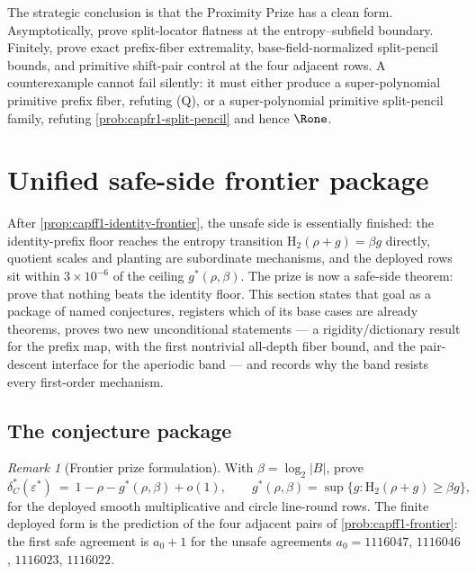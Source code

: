 \documentclass[11pt]{article}
\theoremstyle{definition}
\theoremstyle{remark}
\newtheorem{remark}[remark]{Remark}
\newcommand{\F}{\mathbb{F}}
\newcommand{\B}{B}
\newcommand{\RS}{\mathrm{RS}}
\newcommand{\Hb}{\mathrm{H}_2}
\begin{document}
The strategic conclusion is that the Proximity Prize has a clean form.  Asymptotically, prove split-locator flatness at the entropy--subfield boundary.  Finitely, prove exact prefix-fiber extremality, base-field-normalized split-pencil bounds, and primitive shift-pair control at the four adjacent rows.  A counterexample cannot fail silently: it must either produce a super-polynomial primitive prefix fiber, refuting \textup{(Q)}, or a super-polynomial primitive split-pencil family, refuting \cref{prob:capfr1-split-pencil} and hence \(\Rone\).

\providecommand{\F}{\mathbb F}
\providecommand{\RS}{\mathrm{RS}}
\providecommand{\ceil}[1]{\left\lceil #1\right\rceil}
\providecommand{\floor}[1]{\left\lfloor #1\right\rfloor}

\section{Unified safe-side frontier package}\label{sec:capfp-prize}

After \cref{prop:capff1-identity-frontier}, the unsafe side is essentially finished: the identity-prefix floor reaches the entropy transition $\Hb(\rho+g)=\beta g$ directly, quotient scales and planting are subordinate mechanisms, and the deployed rows sit within $3\times10^{-6}$ of the ceiling $g^*(\rho,\beta)$.  The prize is now a safe-side theorem: prove that nothing beats the identity floor.  This section states that goal as a package of named conjectures, registers which of its base cases are already theorems, proves two new unconditional statements --- a rigidity/dictionary result for the prefix map, with the first nontrivial all-depth fiber bound, and the pair-descent interface for the aperiodic band --- and records why the band resists every first-order mechanism.

\subsection{The conjecture package}

\begin{remark}[Frontier prize formulation]\label{prob:capfp-F}
With $\beta=\log_2|\B|$, prove
\[
        \delta^*_C(\varepsilon^*)\ =\ 1-\rho-g^*(\rho,\beta)+o(1),
        \qquad
        g^*(\rho,\beta)=\sup\{g:\Hb(\rho+g)\ge\beta g\},
\]
for the deployed smooth multiplicative and circle line-round rows.  The finite deployed form is the prediction of the four adjacent pairs of \cref{prob:capff1-frontier}: the first safe agreement is $a_0+1$ for the unsafe agreements $a_0=1116047$, $1116046$, $1116023$, $1116022$.
\end{remark}
\end{document}
